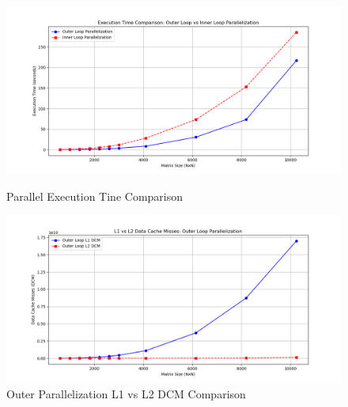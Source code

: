 \documentclass{article}
\begin{document}
\begin{figure}[H]
    \centering
    \begin{minipage}{0.48\textwidth} %
        \centering
        \includegraphics[width=\textwidth]{Figure_7.png} %
        \caption{\small Parallel Execution Tine Comparison}
        \label{fig:execution_time_parallel}
    \end{minipage}
    \hfill
    \begin{minipage}{0.48\textwidth} %
        \centering
        \includegraphics[width=\textwidth]{Figure_8.png} %
        \caption{\small Outer Parallelization L1 vs L2 DCM Comparison}
        \label{fig:cache_misses_parallel1}
    \end{minipage}
    \vspace{0.5cm} %


\end{figure}
\end{document}
